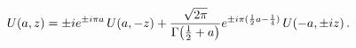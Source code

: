 \[\mathop{U\/}\nolimits\!\left(a,z\right)=\pm ie^{\pm i\pi a}\mathop{U\/}%
\nolimits\!\left(a,-z\right)+\frac{\sqrt{2\pi}}{\mathop{\Gamma\/}\nolimits\!%
\left(\tfrac{1}{2}+a\right)}e^{\pm i\pi(\frac{1}{2}a-\frac{1}{4})}\mathop{U\/}%
\nolimits\!\left(-a,\pm iz\right).\]